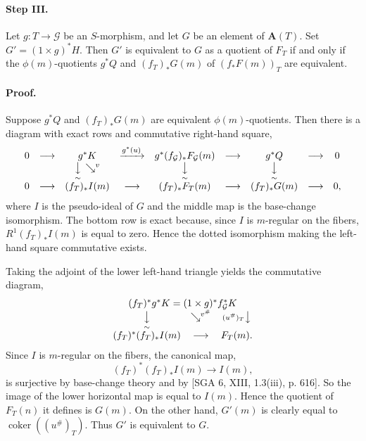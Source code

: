 

\DeclareMathOperator{\coker}{coker}


\paragraph{Step III.}
Let $g:T\to\mathcal{G}$ be an $S$-morphism, and let $G$ be an element of
$\mathbf{A}(T)$. Set $G'=(1\times g)^*H$. Then $G'$ is equivalent to $G$ as
a quotient of $F_T$ if and only if the $\phi(m)$-quotients $g^*Q$ and
$(f_T)_*G(m)$ of $(f_*F(m))_T$ are equivalent.

\paragraph{Proof.}
Suppose $g^*Q$ and $(f_T)_*G(m)$ are equivalent $\phi(m)$-quotients. Then
there is a diagram with exact rows and commutative right-hand square,
\[
\begin{array}{ccccccccc}
0&\longrightarrow&g^*K&\xrightarrow{g^*(u)}&
g^*(f_{\mathcal G})_*F_{\mathcal G}(m)&\longrightarrow&g^*Q&\longrightarrow&0
\\
&&\underset{\sim}{\big\downarrow}\,\searrow^{v}
&&\underset{\sim}{\big\downarrow}
&&\underset{\sim}{\big\downarrow}
\\
0&\longrightarrow&(f_T)_*I(m)&\longrightarrow&(f_T)_*F_T(m)
&\longrightarrow&(f_T)_*G(m)&\longrightarrow&0,
\end{array}
\]
where $I$ is the pseudo-ideal of $G$ and the middle map is the base-change
isomorphism. The bottom row is exact because, since $I$ is $m$-regular on
the fibers, $R^1(f_T)_*I(m)$ is equal to zero. Hence the dotted isomorphism
making the left-hand square commutative exists.

Taking the adjoint of the lower left-hand triangle yields the commutative
diagram,
\[
\begin{array}{ccc}
\multicolumn{3}{c}{(f_T)^*g^*K=(1\times g)^*f_{\mathcal G}^*K}
\\
\underset{\sim}{\big\downarrow}&\searrow^{v^\#}&
{\scriptstyle (u^\#)_T}\big\downarrow
\\
(f_T)^*(f_T)_*I(m)&\longrightarrow&F_T(m).
\end{array}
\]
Since $I$ is $m$-regular on the fibers, the canonical map,
\[
(f_T)^*(f_T)_*I(m)\longrightarrow I(m),
\]
is surjective by base-change theory and by [SGA 6, XIII, 1.3(iii), p. 616].
So the image of the lower horizontal map is equal to $I(m)$. Hence the
quotient of $F_T(n)$ it defines is $G(m)$. On the other hand, $G'(m)$ is
clearly equal to $\coker((u^\#)_T)$. Thus $G'$ is equivalent to $G$.

